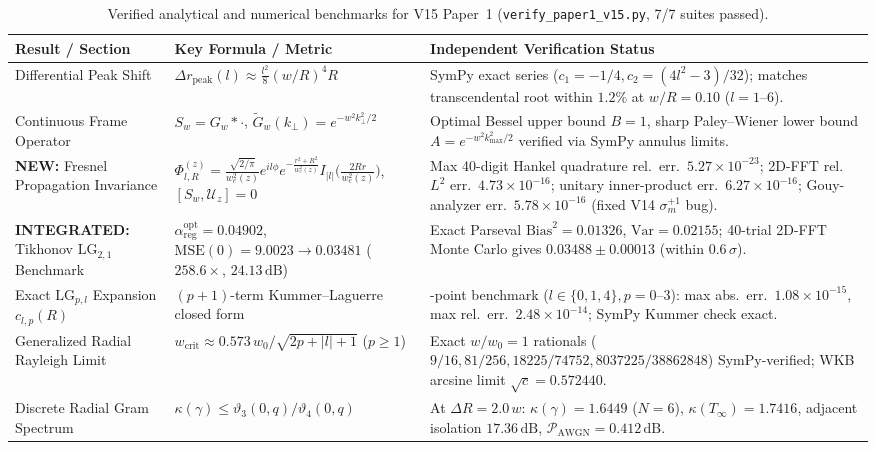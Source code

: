 \documentclass[10pt,letterpaper]{article}
\newcommand{\abs}[1]{\lvert #1 \rvert}
\begin{document}
\begin{table}[t]
\centering
\caption{Verified analytical and numerical benchmarks for V15 Paper~1 (\texttt{verify\_paper1\_v15.py}, 7/7 suites passed).}
\label{tab:p1_benchmarks}
\scriptsize
\renewcommand{\arraystretch}{1.14}
\begin{tabularx}{\linewidth}{@{}l>{\raggedright\arraybackslash}p{4.3cm}>{\raggedright\arraybackslash}X@{}}
\toprule
\textbf{Result / Section} & \textbf{Key Formula / Metric} & \textbf{Independent Verification Status} \\
\midrule
Differential Peak Shift & $\Delta r_{\mathrm{peak}}(l) \approx \frac{l^2}{8}(w/R)^4 R$ & SymPy exact series ($c_1=-1/4, c_2=(4l^2-3)/32$); matches transcendental root within $1.2\%$ at $w/R=0.10$ ($l=1\text{--}6$). \\
Continuous Frame Operator & $S_w = G_w * \cdot$, $\widetilde{G}_w(k_\perp) = e^{-w^2 k_\perp^2/2}$ & Optimal Bessel upper bound $B=1$, sharp Paley--Wiener lower bound $A=e^{-w^2 k_{\max}^2/2}$ verified via SymPy annulus limits. \\
\rowcolor{greenbg}
\textbf{NEW:} Fresnel Propagation Invariance & $\Phi_{l,R}^{(z)} = \frac{\sqrt{2/\pi}}{w_c^2(z)} e^{il\phi} e^{-\frac{r^2+R^2}{w_c^2(z)}} I_{\abs{l}}\!\bigl(\frac{2Rr}{w_c^2(z)}\bigr)$, $[S_w,\mathcal{U}_z]=0$ & Max 40-digit Hankel quadrature rel.\ err.\ $5.27\times 10^{-23}$; 2D-FFT rel.\ $L^2$ err.\ $4.73\times 10^{-16}$; unitary inner-product err.\ $6.27\times 10^{-16}$; Gouy-analyzer err.\ $5.78\times 10^{-16}$ (fixed V14 $\sigma_m^{+1}$ bug). \\
\rowcolor{greenbg}
\textbf{INTEGRATED:} Tikhonov $\mathrm{LG}_{2,1}$ Benchmark & $\alpha_{\mathrm{reg}}^{\mathrm{opt}} = 0.04902$, $\mathrm{MSE}(0)=9.0023 \to 0.03481$ ($258.6\times$, $24.13\,\mathrm{dB}$) & Exact Parseval $\mathrm{Bias}^2 = 0.01326$, $\mathrm{Var}=0.02155$; 40-trial 2D-FFT Monte Carlo gives $0.03488 \pm 0.00013$ (within $0.6\,\sigma$). \\
Exact $\mathrm{LG}_{p,l}$ Expansion $c_{l,p}(R)$ & $(p+1)$-term Kummer--Laguerre closed form & 36-point benchmark ($l\in\{0,1,4\}, p=0\text{--}3$): max abs.\ err.\ $1.08\times 10^{-15}$, max rel.\ err.\ $2.48\times 10^{-14}$; SymPy Kummer check exact. \\
Generalized Radial Rayleigh Limit & $w_{\mathrm{crit}} \approx 0.573\,w_0/\sqrt{2p+\abs{l}+1}$ ($p\ge 1$) & Exact $w/w_0=1$ rationals ($9/16, 81/256, 18225/74752, 8037225/38862848$) SymPy-verified; WKB arcsine limit $\sqrt{c} = 0.572440$. \\
Discrete Radial Gram Spectrum & $\kappa(\gamma) \le \vartheta_3(0,q)/\vartheta_4(0,q)$ & At $\Delta R = 2.0\,w$: $\kappa(\gamma)=1.6449$ ($N=6$), $\kappa(T_\infty)=1.7416$, adjacent isolation $17.36\,\mathrm{dB}$, $\mathcal{P}_{\mathrm{AWGN}} = 0.412\,\mathrm{dB}$. \\
\bottomrule
\end{tabularx}
\end{table}
\end{document}
